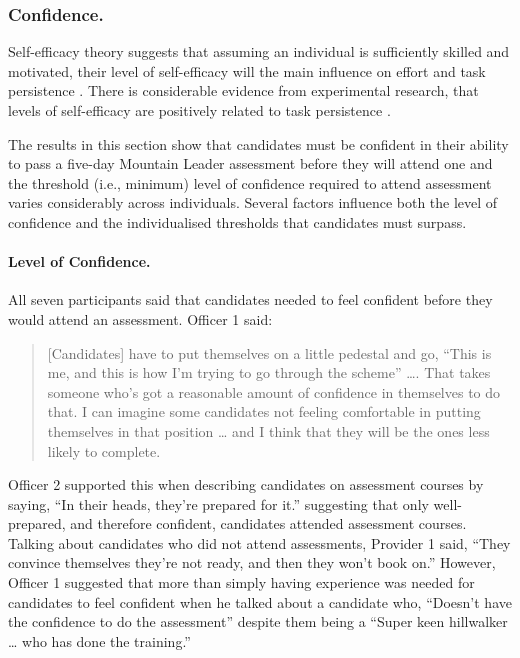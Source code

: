 \documentclass[
  12pt,
  a4paper,
]{book}
\begin{document}
\hypertarget{qual-gta-confidence}{%
\subsubsection{Confidence.}\label{qual-gta-confidence}}

Self-efficacy theory suggests that assuming an individual is sufficiently skilled and motivated, their level of self-efficacy will the main influence on effort and task persistence \citep{Bandura1977, Bandura1982, Bandura1997}. There is considerable evidence from experimental research, that levels of self-efficacy are positively related to task persistence \citep[e.g.,][]{Hutchinson2008, Tenenbaum2001, Weinberg1979, Weinberg1980, Weinberg1981}.

The results in this section show that candidates must be confident in their ability to pass a five-day Mountain Leader assessment before they will attend one and the threshold (i.e., minimum) level of confidence required to attend assessment varies considerably across individuals. Several factors influence both the level of confidence and the individualised thresholds that candidates must surpass.

\hypertarget{level-of-confidence.}{%
\paragraph{Level of Confidence.}\label{level-of-confidence.}}

All seven participants said that candidates needed to feel confident before they would attend an assessment. Officer 1 said:

\begin{quote}
{[}Candidates{]} have to put themselves on a little pedestal and go, ``This is me, and this is how I'm trying to go through the scheme'' \ldots. That takes someone who's got a reasonable amount of confidence in themselves to do that. I can imagine some candidates not feeling comfortable in putting themselves in that position \ldots{} and I think that they will be the ones less likely to complete.
\end{quote}

Officer 2 supported this when describing candidates on assessment courses by saying, ``In their heads, they're prepared for it.'' suggesting that only well-prepared, and therefore confident, candidates attended assessment courses. Talking about candidates who did not attend assessments, Provider 1 said, ``They convince themselves they're not ready, and then they won't book on.'' However, Officer 1 suggested that more than simply having experience was needed for candidates to feel confident when he talked about a candidate who, ``Doesn't have the confidence to do the assessment'' despite them being a ``Super keen hillwalker \ldots{} who has done the training.''
\end{document}
